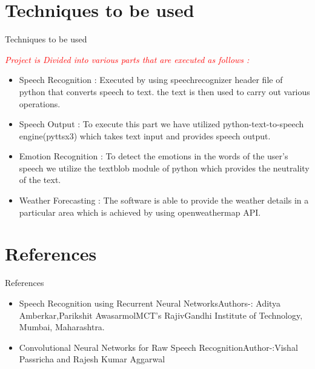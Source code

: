 \documentclass{beamer}
\begin{document}
\section{Techniques to be used}
\begin{frame}[t]{Techniques to be used}
    \begin{center}
	\LARGE
	\textcolor{red}{\textit{Project is Divided into various parts that are executed as follows : }}\\ 
    \end{center}
	\begin{itemize}
		\item Speech Recognition : Executed by using speechrecognizer header file of python that converts speech to text. the text is then used to carry out various operations.
		\item Speech Output : To execute this part we have utilized python-text-to-speech engine(pyttsx3) which takes text input and provides speech output. 
		\item  Emotion Recognition : To detect the emotions in the words of the user's speech we utilize the textblob module of python which provides the neutrality of the text.
		\item Weather Forecasting : The software is able to provide the weather details in a particular area which is achieved by using openweathermap API. 
	\end{itemize}
	\end{frame}
\section{References}
\begin{frame}[t]{References}
    \begin{center}
        \begin{itemize}
            \vspace{1 cm}
            \item Speech Recognition using Recurrent Neural NetworksAuthors-: Aditya Amberkar,Parikshit AwasarmolMCT’s RajivGandhi Institute of Technology, Mumbai, Maharashtra.
            \vspace{1 cm}
            \item Convolutional Neural Networks for Raw Speech RecognitionAuthor-:Vishal Passricha and Rajesh Kumar Aggarwal
        \end{itemize}
    \end{center}
\end{frame}
\end{document}
